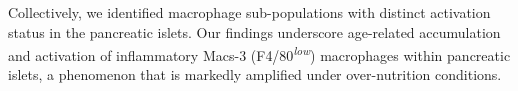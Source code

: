 \par Collectively, we identified macrophage sub-populations with distinct activation status in the pancreatic islets. Our findings underscore age-related accumulation and activation of inflammatory Macs-3 (F4/80\textsuperscript{\textit{low}}) macrophages within pancreatic islets, a phenomenon that is markedly amplified under over-nutrition conditions.





